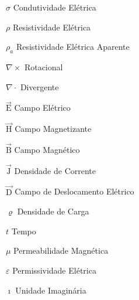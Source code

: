 \documentclass[12pt,twoside,oneright,a4paper,chapter=TITLE,english,brazil]{unipampa}
\newcommand{\vetor}[1]{\vec{\textrm{#1}}}
\begin{document}
\begin{simbolos}
    \item[$\sigma$]                  Condutividade Elétrica
    \item[$\rho$]                    Resistividade Elétrica
    \item[$\rho_a$]                  Resistividade Elétrica Aparente
    \item[$\nabla \times$]           Rotacional
    \item[$\nabla \cdot$]            Divergente
    \item[$\vetor{E}$]               Campo Elétrico
    \item[$\vetor{H}$]               Campo Magnetizante
    \item[$\vetor{B}$]               Campo Magnético
    \item[$\vetor{J}$]               Densidade de Corrente
    \item[$\vetor{D}$]               Campo de Deslocamento Elétrico
    \item[$\varrho$]                 Densidade de Carga
    \item[$t$]                       Tempo
    \item[$\mu$]                     Permeabilidade Magnética
    \item[$\varepsilon$]             Permissividade Elétrica
    \item[$\imath$]                  Unidade Imaginária                   
\end{simbolos}


\tableofcontents       %
\end{document}
